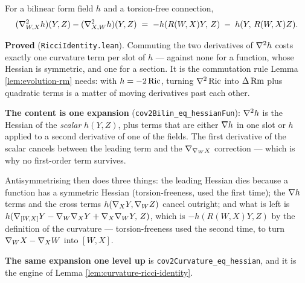 \begin{lemma}
  \label{lem:bilin-ricci-identity}
  \leanok
  For a bilinear form field $h$ and a torsion-free connection,
  \[
    (\nabla^2_{W,X}h)(Y,Z) - (\nabla^2_{X,W}h)(Y,Z)
      \;=\; -h(R(W,X)Y,\,Z) \;-\; h(Y,\,R(W,X)Z).
  \]

  \textbf{Proved} (\texttt{RicciIdentity.lean}). Commuting the two derivatives
  of $\nabla^2 h$ costs exactly one curvature term per slot of $h$ --- against
  none for a function, whose Hessian is symmetric, and one for a section. It is
  the commutation rule Lemma \ref{lem:evolution-rm} needs: with $h = -2\operatorname{Ric}$,
  turning $\nabla^2\operatorname{Ric}$ into $\Delta\operatorname{Rm}$ plus quadratic terms is a matter of
  moving derivatives past each other.

  \textbf{The content is one expansion} (\texttt{cov2Bilin\_eq\_hessianFun}):
  $\nabla^2 h$ is the Hessian of the \emph{scalar} $h(Y,Z)$, plus terms that are
  either $\nabla h$ in one slot or $h$ applied to a second derivative of one of
  the fields. The first derivative of the scalar cancels between the leading
  term and the $\nabla_{\nabla_W X}$ correction --- which is why no first-order
  term survives.

  Antisymmetrising then does three things: the leading Hessian dies because a
  function has a symmetric Hessian (torsion-freeness, used the first time); the
  $\nabla h$ terms and the cross terms $h(\nabla_X Y, \nabla_W Z)$ cancel outright;
  and what is left is
  $h(\nabla_{[W,X]}Y - \nabla_W\nabla_X Y + \nabla_X\nabla_W Y,\, Z)$, which is
  $-h(R(W,X)Y,Z)$ by the definition of the curvature --- torsion-freeness used
  the second time, to turn $\nabla_W X - \nabla_X W$ into $[W,X]$.

  \textbf{The same expansion one level up} is
  \texttt{cov2Curvature\_eq\_hessian}, and it is the engine of
  Lemma \ref{lem:curvature-ricci-identity}.
\end{lemma}

